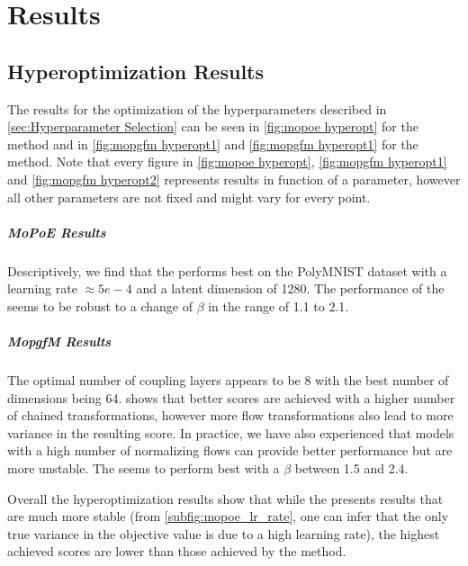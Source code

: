 \chapter{Results}
\label{chap:results}




\section{Hyperoptimization Results}

The results for the optimization of the hyperparameters described in \cref{sec:Hyperparameter Selection} can be seen in \cref{fig:mopoe hyperopt} for the  method and in \cref{fig:mopgfm hyperopt1} and \cref{fig:mopgfm hyperopt1} for the  method.
Note that every figure in \cref{fig:mopoe hyperopt}, \cref{fig:mopgfm hyperopt1} and \cref{fig:mopgfm hyperopt2} represents results in function of a parameter, however all other parameters are not fixed and might vary for every point.

\paragraph{MoPoE Results} Descriptively, we find that the  performs best on the PolyMNIST dataset with a learning rate $\approx 5e-4$ and a latent dimension of 1280.
The performance of the  seems to be robust to a change of $\beta$ in the range of 1.1 to 2.1.

\paragraph{MopgfM Results} The optimal number of coupling layers appears to be 8 with the best number of dimensions being 64.
 shows that better scores are achieved with a higher number of chained transformations, however more flow transformations also lead to more variance in the resulting score.
In practice, we have also experienced that models with a high number of normalizing flows can provide better performance but are more unstable.
The  seems to perform best with a $\beta$ between 1.5 and 2.4.

Overall the hyperoptimization results show that while the  presents results that are much more stable (from \cref{subfig:mopoe_lr_rate}, one can infer that the only true variance in the objective value is due to a high learning rate), the highest achieved scores are lower than those achieved by the  method.



